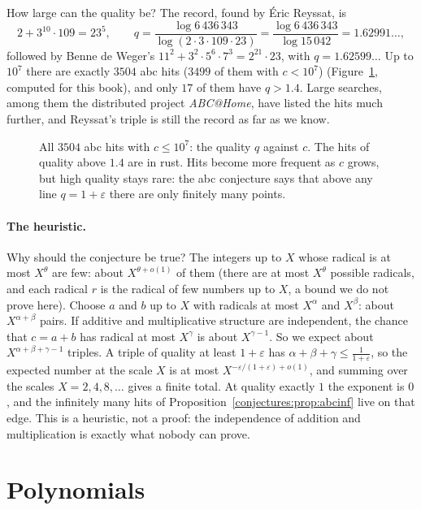 How large can the quality be? The record, found by \'Eric Reyssat, is
\[
2+3^{10}\cdot109=23^5,\qquad q=\frac{\log 6\,436\,343}{\log(2\cdot3\cdot109\cdot23)}=\frac{\log6\,436\,343}{\log15\,042}=1.62991\ldots,
\]
followed by Benne de Weger's $11^2+3^2\cdot5^6\cdot7^3=2^{21}\cdot23$, with $q=1.62599\ldots$ Up to $10^7$ there are exactly $3504$ abc hits ($3499$ of them with $c<10^7$)
(Figure~\ref{conjectures:fig:abcquality}, computed for this book), and only $17$ of them have $q>1.4$. Large searches, among them the distributed project
\emph{ABC@Home}, have listed the hits much further, and Reyssat's triple is still the record as far as we know.

\begin{figure}[ht]
\centering
{}
\caption{All $3504$ abc hits with $c\le10^7$: the quality $q$ against $c$. The hits of quality above $1.4$ are in rust. Hits become more frequent as $c$
grows, but high quality stays rare: the abc conjecture says that above any line $q=1+\varepsilon$ there are only finitely many points.}
\label{conjectures:fig:abcquality}
\end{figure}

\paragraph{The heuristic.} Why should the conjecture be true? The integers up to $X$ whose radical is at most $X^\theta$ are few: about $X^{\theta+o(1)}$
of them (there are at most $X^\theta$ possible radicals, and each radical $r$ is the radical of few numbers up to $X$, a bound we do not prove here).
Choose $a$ and $b$ up to $X$ with radicals at most $X^\alpha$ and $X^\beta$: about $X^{\alpha+\beta}$ pairs. If additive and multiplicative structure
are independent, the chance that $c=a+b$ has radical at most $X^\gamma$ is about $X^{\gamma-1}$. So we expect about $X^{\alpha+\beta+\gamma-1}$ triples.
A triple of quality at least $1+\varepsilon$ has $\alpha+\beta+\gamma\le\frac1{1+\varepsilon}$, so the expected number at the scale $X$ is at most
$X^{-\varepsilon/(1+\varepsilon)+o(1)}$, and summing over the scales $X=2,4,8,\dots$ gives a finite total. At quality exactly $1$ the exponent is $0$,
and the infinitely many hits of Proposition~\ref{conjectures:prop:abcinf} live on that edge. This is a heuristic, not a proof: the independence of addition and
multiplication is exactly what nobody can prove.

\section{Polynomials}

